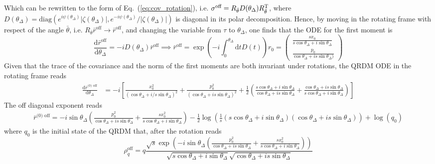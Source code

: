\documentclass[%
reprint,
superscriptaddress,
nofootinbib,
 amsmath,amssymb,
prx,
floatfix,
]{revtex4-2}
\begin{document}
Which can be rewritten to the form of Eq.~(\ref{eq:cov_rotation}), i.e. $\sigma^{\text{off}} = R_{\bar{\theta}} D (\theta_\Delta) R_{\bar{\theta}}^{\rm T}$, where $D (\theta_\Delta) = \text{diag} (e^{i \psi (\theta_\Delta)} |\zeta (\theta_\Delta)|, e^{-i \psi(\theta_\Delta)} /|\zeta(\theta_\Delta)|) $ is diagonal in its polar decomposition. Hence, by moving in the rotating frame with respect of the angle $\bar{\theta}$, i.e. $R_{\bar{\theta}} \bar{r}^{\text{off}} \to \bar{r}^{\text{off}}$, and changing the variable from $\tau$ to $\theta_\Delta$, one finds that the ODE for the first moment is 
\begin{equation}
   \frac{ \text{d} \bar{r}^{\text{off}}}{\text{d} \theta_{\Delta}} =   - i  D (\theta_\Delta) \bar{r}^{\text{off}} \implies \bar{r}^{\text{off}} = \exp \left( - i \int_{0}^{\theta_{\Delta}} \text{d} t D (t) \right) r_0 = \begin{pmatrix}
\frac{s  x_0}{s \cos \theta_\Delta +i \sin \theta_\Delta }  \\
 \frac{p_0}{\cos \theta_\Delta +i s \sin \theta_\Delta )}  
   \end{pmatrix}
\end{equation}
Given that the trace of the covariance and the norm of the first moments are both invariant under rotations, the QRDM ODE in the rotating frame reads
\begin{align}
    \frac{ \text{d} \bar{r}^{\text{(0) off}}}{\text{d} \theta_{\Delta}}   &= - i \left[ \frac{ x_0^2}{\left(  \cos \theta_\Delta +i / s \sin \theta_\Delta  \right)^2 } +\frac{p_0^2}{\left( \cos \theta_\Delta +i s \sin \theta_\Delta \right)^2} + \frac{1}{2} \left(\frac{s \cos \theta_\Delta +i \sin \theta_\Delta }{\cos \theta_\Delta +i s \sin \theta_\Delta }+\frac{\cos \theta_\Delta +i s \sin \theta_\Delta }{s \cos \theta_\Delta +i \sin \theta_\Delta }\right) \right] \nonumber
\end{align}
The off diagonal exponent reads
\begin{align}  
\bar{r}^{\text{(0) off}} = -i \sin  \theta_\Delta \left(\frac{p_0^2}{\cos  \theta_\Delta+i s \sin  \theta_\Delta}+\frac{s x_0^2}{s \cos  \theta_\Delta+i \sin  \theta_\Delta}\right)-\frac{1}{2} \log \left(\frac{1}{s}(s \cos  \theta_\Delta+i \sin  \theta_\Delta) (\cos  \theta_\Delta+i s \sin  \theta_\Delta)\right)+\log(q_0)\nonumber
\end{align}
where $q_0$ is the initial state of the QRDM that, after the rotation reads 
\begin{equation}
    \rho_q^{\text{off}} = q \frac{\sqrt{s} \exp \left( -i \sin  \theta_\Delta \left(\frac{p_0^2}{\cos  \theta_\Delta+i s \sin  \theta_\Delta}+\frac{s x_0^2}{s \cos  \theta_\Delta+i \sin  \theta_\Delta}\right) \right) }{ \sqrt{s \cos  \theta_\Delta+i \sin  \theta_\Delta} \sqrt{\cos  \theta_\Delta+i s \sin  \theta_\Delta }} 
\end{equation}
\end{document}
